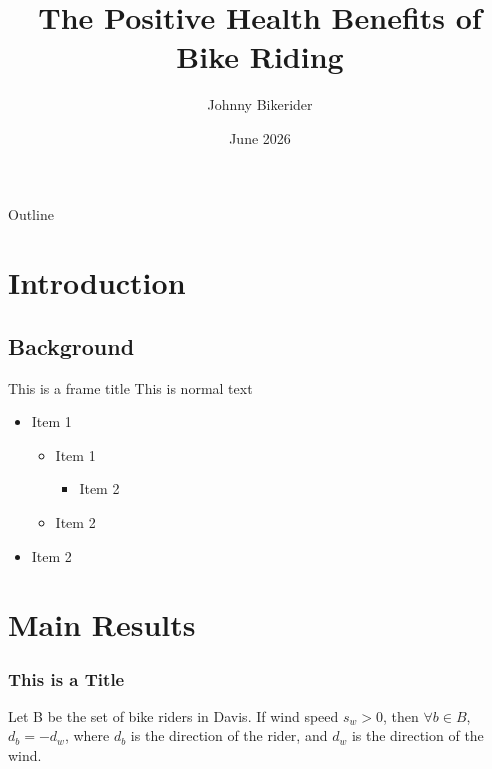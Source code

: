 \documentclass[aspectratio=169]{beamer}
\title{The Positive Health Benefits of Bike Riding}
\author{Johnny Bikerider}
\institute{University of California, Davis}
\date{June 2026}
\begin{document}
\begin{frame}
\titlepage
\end{frame}

\begin{frame}{Outline}
\tableofcontents
\end{frame}

\section{Introduction}
\subsection{Background}

\begin{frame}{This is a frame title}
\label{list}
This is normal text

\begin{itemize}
	\item Item 1
	\begin{itemize}
	\item Item 1
	\begin{itemize}
	\item Item 2
\end{itemize}
	\item Item 2
\end{itemize}
	\item Item 2
\end{itemize}
\end{frame}

\section{Main Results}

\begin{frame}
\frametitle{This is a Title}

\begin{theorem}
Let B be the set of bike riders in Davis. If wind speed $s_{w} > 0$, then $\forall b \in B$, $d_{b} = - d_{w}$, where $d_{b}$ is the direction of the rider, and $d_{w}$ is the direction of the wind. 
\end{theorem}

                \hyperlink{list}{}
\end{frame}
\end{document}
